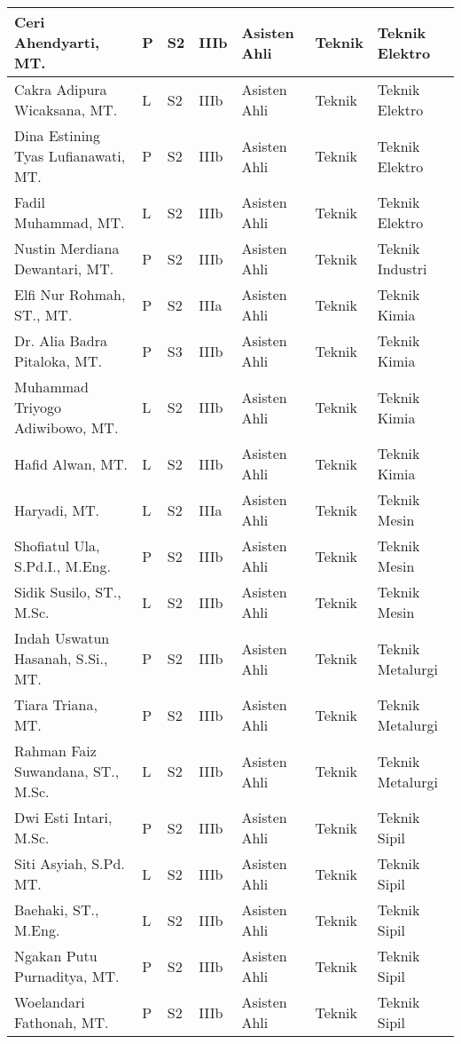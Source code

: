 \documentclass[
]{book}
\begin{document}
\begin{longtable}{l|l|l|l|l|l|l}
\hline
Ceri Ahendyarti, MT. & P & S2 & IIIb & Asisten Ahli & Teknik & Teknik Elektro\\
\hline
Cakra Adipura Wicaksana, MT. & L & S2 & IIIb & Asisten Ahli & Teknik & Teknik Elektro\\
\hline
Dina Estining Tyas Lufianawati, MT. & P & S2 & IIIb & Asisten Ahli & Teknik & Teknik Elektro\\
\hline
Fadil Muhammad, MT. & L & S2 & IIIb & Asisten Ahli & Teknik & Teknik Elektro\\
\hline
Nustin Merdiana Dewantari, MT. & P & S2 & IIIb & Asisten Ahli & Teknik & Teknik Industri\\
\hline
Elfi Nur Rohmah, ST., MT. & P & S2 & IIIa & Asisten Ahli & Teknik & Teknik Kimia\\
\hline
Dr. Alia Badra Pitaloka, MT. & P & S3 & IIIb & Asisten Ahli & Teknik & Teknik Kimia\\
\hline
Muhammad Triyogo Adiwibowo, MT. & L & S2 & IIIb & Asisten Ahli & Teknik & Teknik Kimia\\
\hline
Hafid Alwan, MT. & L & S2 & IIIb & Asisten Ahli & Teknik & Teknik Kimia\\
\hline
Haryadi, MT. & L & S2 & IIIa & Asisten Ahli & Teknik & Teknik Mesin\\
\hline
Shofiatul Ula, S.Pd.I., M.Eng. & P & S2 & IIIb & Asisten Ahli & Teknik & Teknik Mesin\\
\hline
Sidik Susilo, ST., M.Sc. & L & S2 & IIIb & Asisten Ahli & Teknik & Teknik Mesin\\
\hline
Indah Uswatun Hasanah, S.Si., MT. & P & S2 & IIIb & Asisten Ahli & Teknik & Teknik Metalurgi\\
\hline
Tiara Triana, MT. & P & S2 & IIIb & Asisten Ahli & Teknik & Teknik Metalurgi\\
\hline
Rahman Faiz Suwandana, ST., M.Sc. & L & S2 & IIIb & Asisten Ahli & Teknik & Teknik Metalurgi\\
\hline
Dwi Esti Intari, M.Sc. & P & S2 & IIIb & Asisten Ahli & Teknik & Teknik Sipil\\
\hline
Siti Asyiah, S.Pd. MT. & L & S2 & IIIb & Asisten Ahli & Teknik & Teknik Sipil\\
\hline
Baehaki, ST., M.Eng. & L & S2 & IIIb & Asisten Ahli & Teknik & Teknik Sipil\\
\hline
Ngakan Putu Purnaditya, MT. & P & S2 & IIIb & Asisten Ahli & Teknik & Teknik Sipil\\
\hline
Woelandari Fathonah, MT. & P & S2 & IIIb & Asisten Ahli & Teknik & Teknik Sipil\\

\end{longtable}
\end{document}
